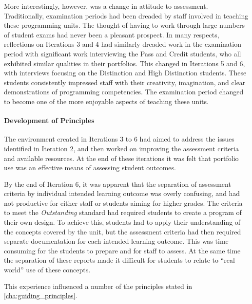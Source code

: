 More interestingly, however, was a change in attitude to assessment. Traditionally, examination periods had been dreaded by staff involved in teaching these programming units. The thought of having to work through large numbers of student exams had never been a pleasant prospect. In many respects, reflections on Iterations 3 and 4 had similarly dreaded work in the examination period with significant work interviewing the Pass and Credit students, who all exhibited similar qualities in their portfolios. This changed in Iterations 5 and 6, with interviews focusing on the Distinction and High Distinction students. These students consistently impressed staff with their creativity, imagination, and clear demonstrations of programming competencies. The examination period changed to become one of the more enjoyable aspects of teaching these units.

\paragraph{Development of Principles} %

The environment created in Iterations 3 to 6 had aimed to address the issues identified in Iteration 2, and then worked on improving the assessment criteria and available resources. At the end of these iterations it was felt that portfolio use was an effective means of assessing student outcomes.

By the end of Iteration 6, it was apparent that the separation of assessment criteria by individual intended learning outcome was overly confusing, and had not productive for either staff or students aiming for higher grades. The criteria to meet the \emph{Outstanding} standard had required students to create a program of their own design. To achieve this, students had to apply their understanding of the concepts covered by the unit, but the assessment criteria had then required separate documentation for each intended learning outcome. This was time consuming for the students to prepare and for staff to assess. At the same time the separation of these reports made it difficult for students to relate to ``real world'' use of these concepts.

This experience influenced a number of the principles stated in \cref{cha:guiding_principles}. 

